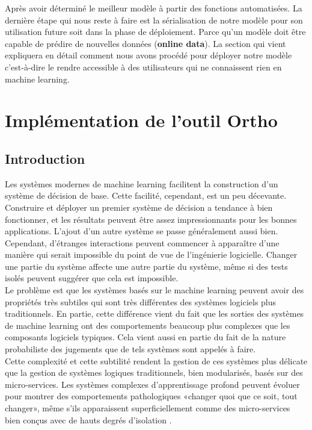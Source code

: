 \documentclass[12pt, french]{report}
\begin{document}
Après avoir déterminé le meilleur modèle à partir des fonctions automatisées. La dernière étape qui nous reste à faire est la sérialisation de notre modèle pour son utilisation future soit dans la phase de déploiement. Parce qu'un modèle doit être capable de prédire de nouvelles données (\textbf{online data}). La section qui vient expliquera en détail comment nous avons procédé pour déployer notre modèle c'est-à-dire le rendre accessible à des utilisateurs qui ne connaissent rien en machine learning.  \\ 



 

\chapter{Implémentation de l'outil Ortho} \label{chap:ortho}
\section{Introduction}

Les systèmes modernes de machine learning facilitent la construction d'un système de décision de base. Cette facilité, cependant, est un peu décevante. Construire et déployer un premier système de décision a tendance à bien fonctionner, et les résultats peuvent être assez impressionnants pour les bonnes applications. L'ajout d'un autre système se passe généralement aussi bien. Cependant, d'étranges interactions peuvent commencer à apparaître d'une manière qui serait impossible du point de vue de l'ingénierie logicielle. Changer une partie du système affecte une autre partie du système, même si des tests isolés peuvent suggérer que cela est impossible. \\

Le problème est que les systèmes basés sur le machine learning peuvent avoir des propriétés très subtiles qui sont très différentes des systèmes logiciels plus traditionnels. En partie, cette différence vient du fait que les sorties des systèmes de machine learning ont des comportements beaucoup plus complexes que les composants logiciels typiques. Cela vient aussi en partie du fait de la nature probabiliste des jugements que de tels systèmes sont appelés à faire. \\

Cette complexité et cette subtilité rendent la gestion de ces systèmes plus délicate que la gestion de systèmes logiques traditionnels, bien modularisés, basés sur des micro-services. Les systèmes complexes d'apprentissage profond peuvent évoluer pour montrer des comportements pathologiques «changer quoi que ce soit, tout changer», même s'ils apparaissent superficiellement comme des micro-services bien conçus avec de hauts degrés d'isolation \cite{key7}.\\
\end{document}

